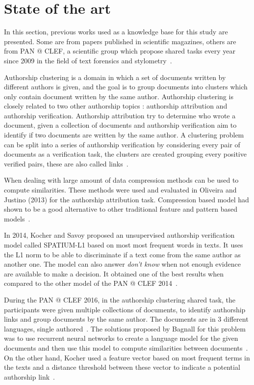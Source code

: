 \section{State of the art \label{sec:state_of_the_art}}

In this section, previous works used as a knowledge base for this study are presented. Some are from papers published in scientific magazines, others are from PAN @ CLEF, a scientific group which propose shared tasks every year since 2009 in the field of text forensics and stylometry~\cite{pan_webis}.

Authorship clustering is a domain in which a set of documents written by different authors is given, and the goal is to group documents into clusters which only contain document written by the same author.
Authorship clustering is closely related to two other authorship topics : authorship attribution and authorship verification.
Authorship attribution try to determine who wrote a document, given a collection of documents and authorship verification aim to identify if two documents are written by the same author.
A clustering problem can be split into a series of authorship verification by considering every pair of documents as a verification task, the clusters are created grouping every positive verified pairs, these are also called links~\cite{pan16_clustering_site}.

When dealing with large amount of data compression methods can be used to compute similarities.
These methods were used and evaluated in Oliveira and Justino (2013) for the authorship attribution task.
Compression based model had shown to be a good alternative to other traditional feature and pattern based models~\cite{comparing_compression}.

In 2014, Kocher and Savoy proposed an unsupervised authorship verification model called \textsc{SPATIUM-L1} based on most most frequent words in texts. It uses the L1 norm to be able to discriminate if a text come from the same author as another one.
The model can also answer \textit{don't know} when not enough evidence are available to make a decision.
It obtained one of the best results when compared to the other model of the PAN @ CLEF 2014~\cite{kocher_linking}.

During the PAN @ CLEF 2016, in the authorship clustering shared task, the participants were given multiple collections of documents, to identify authorship links and group documents by the same author.
The documents are in 3 different languages, single authored~\cite{pan16}.
The solutions proposed by Bagnall for this problem was to use recurrent neural networks to create a language model for the given documents and then use this model to compute similarities between documents~\cite{bagnall_pan16}.
On the other hand, Kocher used a feature vector based on most frequent terms in the texts and a distance threshold between these vector to indicate a potential authorship link~\cite{kocher_pan16}.

